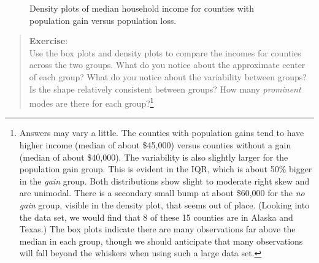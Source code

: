 \documentclass[
  letterpaper,
  DIV=11,
  numbers=noendperiod]{scrreprt}
\begin{document}
\begin{figure}[H]


\caption{\label{fig-dens61}Density plots of median household income for
counties with population gain versus population loss.}

\end{figure}%

\begin{quote}
\textbf{Exercise}:\\
Use the box plots and density plots to compare the incomes for counties
across the two groups. What do you notice about the approximate center
of each group? What do you notice about the variability between groups?
Is the shape relatively consistent between groups? How many
\emph{prominent} modes are there for each group?\footnote{Answers may
  vary a little. The counties with population gains tend to have higher
  income (median of about \$45,000) versus counties without a gain
  (median of about \$40,000). The variability is also slightly larger
  for the population gain group. This is evident in the IQR, which is
  about 50\% bigger in the \emph{gain} group. Both distributions show
  slight to moderate right skew and are unimodal. There is a secondary
  small bump at about \$60,000 for the \emph{no gain} group, visible in
  the density plot, that seems out of place. (Looking into the data set,
  we would find that 8 of these 15 counties are in Alaska and Texas.)
  The box plots indicate there are many observations far above the
  median in each group, though we should anticipate that many
  observations will fall beyond the whiskers when using such a large
  data set.}
\end{quote}
\end{document}
